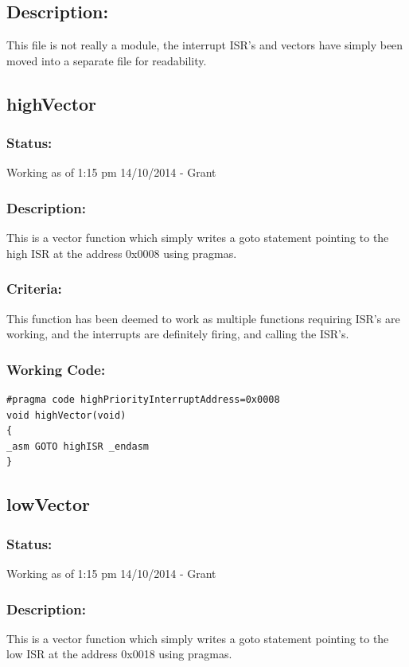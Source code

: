 \documentclass[]{report}
\begin{document}
\subsection{Description:}
This file is not really a module, the interrupt ISR's and vectors have simply been moved into a separate file for readability.

\subsection{highVector}
\subsubsection{Status:}
Working as of 1:15 pm 14/10/2014 - Grant

\subsubsection{Description:}
This is a vector function which simply writes a goto statement pointing to the high ISR at the address 0x0008 using pragmas.

\subsubsection{Criteria:}
This function has been deemed to work as multiple functions requiring ISR's are working, and the interrupts are definitely firing, and calling the ISR's.

\subsubsection{Working Code:}
\begin{lstlisting}
#pragma code highPriorityInterruptAddress=0x0008
void highVector(void)
{
_asm GOTO highISR _endasm
}
\end{lstlisting}

\subsection{lowVector}
\subsubsection{Status:}
Working as of 1:15 pm 14/10/2014 - Grant

\subsubsection{Description:}
This is a vector function which simply writes a goto statement pointing to the low ISR at the address 0x0018 using pragmas.
\end{document}
